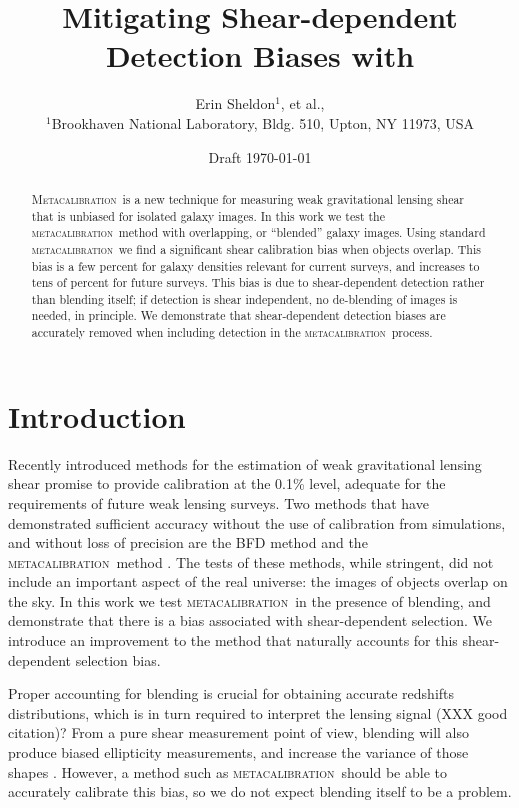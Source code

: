\documentclass[fleqn,useAMS,usenatbib]{mnras}
\title[Metadetection]{Mitigating Shear-dependent Detection Biases with \Mcal}
\author[Sheldon et~al.]{Erin Sheldon$^1$, et al.,
  \\$^1$Brookhaven National Laboratory, Bldg. 510, Upton, NY 11973, USA 
}
\newcommand{\mcal}{\textsc{metacalibration}}
\newcommand{\Mcal}{\textsc{Metacalibration}}
\begin{document}
\date{Draft \today}
\maketitle

\begin{abstract}

\Mcal\ is a new technique for measuring weak gravitational lensing shear that
is unbiased for isolated galaxy images.  In this work we test the \mcal\ method
with overlapping, or ``blended'' galaxy images.  Using standard \mcal\ we find
a significant shear calibration bias when objects overlap. This bias is a few
percent for galaxy densities relevant for current surveys, and increases to
tens of percent for future surveys.  This bias is due to shear-dependent
detection rather than blending itself; if detection is shear independent, no
de-blending of images is needed, in principle.  We demonstrate that
shear-dependent detection biases are accurately removed when including
detection in the \mcal\ process.

\end{abstract}

\section{Introduction}


Recently introduced methods for the estimation of weak gravitational lensing
shear promise to provide calibration at the 0.1\% level, adequate for the
requirements of future weak lensing surveys.  Two methods that have
demonstrated sufficient accuracy without the use of calibration from
simulations, and without loss of precision are the BFD method
\citep{BernBFD2016} and the \mcal\ method \citep{HuffMcal2017,SheldonMcal2017}.
The tests of these methods, while stringent, did not include an important
aspect of the real universe: the images of objects overlap on the sky. In this
work we test \mcal\ in the presence of blending, and demonstrate that there is
a bias associated with shear-dependent selection.  We introduce an improvement
to the method that naturally accounts for this shear-dependent selection bias.

Proper accounting for blending is crucial for obtaining accurate redshifts
distributions, which is in turn required to interpret the lensing signal (XXX good
citation)?  From a pure shear measurement point of view, blending will also produce
biased ellipticity measurements, and increase the variance of those shapes
\citep{DawsonBlending2016}.  However, a method such as \mcal\ should be able
to accurately calibrate this bias, so we do not expect blending itself to 
be a problem.
\end{document}
